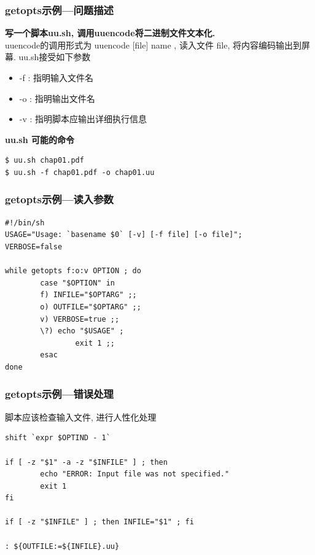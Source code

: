 \documentclass[compress]{beamer}
\begin{document}
\begin{frame}[fragile]
\frametitle{getopts示例---问题描述}

\noindent\textbf{写一个脚本uu.sh, 调用uuencode将二进制文件文本化.} \\
\noindent uuencode的调用形式为 uuencode [file] name , 读入文件 file, 将内容编码输出到屏幕.
uu.sh接受如下参数

\begin{itemize}
    \item -f  : 指明输入文件名
    \item -o  : 指明输出文件名
    \item -v  : 指明脚本应输出详细执行信息
\end{itemize}

\noindent \textbf{uu.sh 可能的命令}

\begin{Verbatim}
$ uu.sh chap01.pdf
$ uu.sh -f chap01.pdf -o chap01.uu
\end{Verbatim}

\end{frame}

\begin{frame}[fragile]
\frametitle{getopts示例---读入参数}

\begin{lstlisting}
#!/bin/sh
USAGE="Usage: `basename $0` [-v] [-f file] [-o file]";
VERBOSE=false

while getopts f:o:v OPTION ; do
        case "$OPTION" in
        f) INFILE="$OPTARG" ;;
        o) OUTFILE="$OPTARG" ;;
        v) VERBOSE=true ;;
        \?) echo "$USAGE" ;
                exit 1 ;;
        esac
done
\end{lstlisting}
\end{frame}

\begin{frame}[fragile]
\frametitle{getopts示例---错误处理}

脚本应该检查输入文件, 进行人性化处理\\
\begin{lstlisting}[firstnumber=last]
shift `expr $OPTIND - 1`

if [ -z "$1" -a -z "$INFILE" ] ; then
        echo "ERROR: Input file was not specified."
        exit 1
fi

if [ -z "$INFILE" ] ; then INFILE="$1" ; fi

: ${OUTFILE:=${INFILE}.uu}

\end{lstlisting}
\end{frame}
\end{document}
